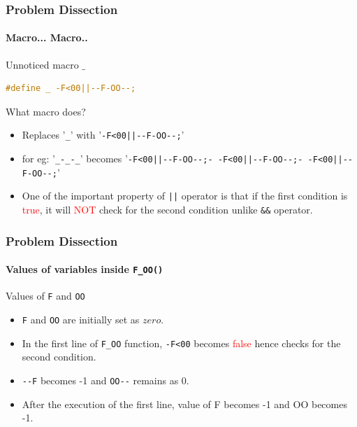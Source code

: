 \documentclass[12pt]{beamer}
\begin{document}
\begin{frame}[fragile]
	\frametitle {Problem Dissection}
	\framesubtitle {Macro... Macro..}
	\begin{block}{Unnoticed macro $\_$ }
		\begin{lstlisting}[language=C]
			#define _ -F<00||--F-OO--;
		\end{lstlisting}	
	\end{block}
	\begin{block}{What macro does?}
		\begin{itemize}
			\item Replaces '\texttt{\_}' with {\tiny '\texttt{-F<00||-{}-F-OO-{}-;}'}
			\item for eg: {\tiny '\texttt{\_-\_-\_}'} becomes {\tiny '\texttt{-F<00||-{}-F-OO-{}-;- -F<00||-{}-F-OO-{}-;- -F<00||-{}-F-OO-{}-;}'}
			\item One of the important property of \texttt{||} operator is that if the first condition is \textcolor{red}{true}, it will \textcolor{red}{NOT} check for the second condition unlike \texttt{\&\&} operator.
		\end{itemize}
	\end{block}
\end{frame}

\begin{frame}[fragile]
	\frametitle{Problem Dissection}
	\framesubtitle{Values of variables inside \texttt{F\_OO()}}
	\begin{block}{Values of \texttt{F} and \texttt{OO}}
		\begin{itemize}
			\item \texttt{F} and \texttt{OO} are initially set as $zero$. 
			\item In the first line of \texttt{F\_OO} function, \texttt{-F<00} becomes \textcolor{red}{false} hence checks for the second condition.
			\item \texttt{-{}-F} becomes -1 and \texttt{OO-{}-} remains as 0.
			\item After the execution of the first line, value of F becomes -1 and OO becomes -1.
		\end{itemize}				
	\end{block}
\end{frame}
\end{document}
